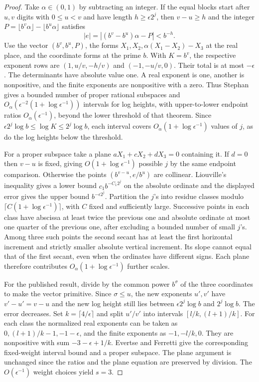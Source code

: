 \begin{proof}
Take \(\alpha\in(0,1)\) by subtracting an integer. If the equal blocks start after \(u,v\) digits with \(0\le u<v\) and have length \(h\ge\epsilon 2^j\), then \(v-u\ge h\) and the integer \(P=\lfloor b^v\alpha\rfloor-\lfloor b^u\alpha\rfloor\) satisfies
\[
 |e|=|(b^v-b^u)\alpha-P|<b^{-h}.
\]
Use the vector \((b^v,b^u,P)\), the forms \(X_1,X_2,\alpha(X_1-X_2)-X_3\) at the real place, and the coordinate forms at the prime \(b\). With \(K=b^v\), the respective exponent rows are \((1,u/v,-h/v)\) and \((-1,-u/v,0)\). Their total is at most \(-\epsilon\). The determinants have absolute value one. A real exponent is one, another is nonpositive, and the finite exponents are nonpositive with a zero. Thus Stephan \cite[Theorem~4.2]{Stephan} gives a bounded number of proper rational subspaces and \(O_\alpha(\epsilon^{-2}(1+\log\epsilon^{-1}))\) intervals for log heights, with upper-to-lower endpoint ratios \(O_\alpha(\epsilon^{-1})\), beyond the lower threshold of that theorem. Since \(\epsilon 2^j\log b\le\log K\le2^j\log b\), each interval covers \(O_\alpha(1+\log\epsilon^{-1})\) values of \(j\), as do the log heights below the threshold.

For a proper subspace take a plane \(aX_1+cX_2+dX_3=0\) containing it. If \(d=0\) then \(v-u\) is fixed, giving \(O(1+\log\epsilon^{-1})\) possible \(j\) by the same endpoint comparison. Otherwise the points \((b^{v-u},e/b^u)\) are collinear. Liouville's inequality gives a lower bound \(c_1b^{-C_1 2^j}\) on the absolute ordinate and the displayed error gives the upper bound \(b^{-\epsilon2^j}\). Partition the \(j\)'s into residue classes modulo \(\lceil C(1+\log\epsilon^{-1})\rceil\), with \(C\) fixed and sufficiently large. Successive points in each class have abscissa at least twice the previous one and absolute ordinate at most one quarter of the previous one, after excluding a bounded number of small \(j\)'s. Among three such points the second secant has at least the first horizontal increment and strictly smaller absolute vertical increment. Its slope cannot equal that of the first secant, even when the ordinates have different signs. Each plane therefore contributes \(O_\alpha(1+\log\epsilon^{-1})\) further scales.

For the published result, divide by the common power \(b^\sigma\) of the three coordinates to make the vector primitive. Since \(\sigma\le u\), the new exponents \(u',v'\) have \(v'-u'=v-u\) and the new log height still lies between \(\epsilon2^j\log b\) and \(2^j\log b\). The error decreases. Set \(k=\lceil4/\epsilon\rceil\) and split \(u'/v'\) into intervals \([l/k,(l+1)/k]\). For each class the normalized real exponents can be taken as \(0,(l+1)/k-1,-1-\epsilon\), and the finite exponents as \(-1,-l/k,0\). They are nonpositive with sum \(-3-\epsilon+1/k\). Evertse and Ferretti \cite[Theorem~3.3]{EF} give the corresponding fixed-weight interval bound and a proper subspace. The plane argument is unchanged since the ratios and the plane equation are preserved by division. The \(O(\epsilon^{-1})\) weight choices yield \(s=3\).
\end{proof}

